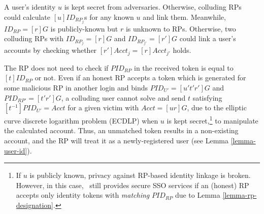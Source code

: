 A user's identity $u$ is kept secret from adversaries. Otherwise, colluding RPs could calculate $[u]ID_{RP_j}$s for any known $u$ and link them.
Meanwhile, $ID_{RP} = [r]G$ is publicly-known but $r$ is unknown to RPs.
Otherwise, two colluding RPs with $ID_{RP_j} = [r]G$ and $ID_{RP_{j'}} = [r']G$ could link a user's accounts by checking whether $[r']Acct_j = [r]Acct_{j'}$ holds.

The RP does not need to check if $PID_{RP}$ in the received token is equal to $[t]{ID_{RP}}$ or not.
Even if an honest RP accepts a token which is generated for some malicious RP in another login and binds $PID_{U'} = [u't'r']G$ and $PID_{RP'}=[t'r']G$,
 a colluding user cannot solve and send $t$ satisfying $[t^{-1}]PID_{U'} = Acct$ for a given victim with $Acct = [ur]G$,
 due to the elliptic curve discrete logarithm problem (ECDLP) when $u$ is kept secret,\footnote{If $u$ is publicly known, privacy against RP-based identity linkage is broken.
    However, in this case, \usso\ still provides secure SSO services if an (honest) RP accepts only identity tokens with \emph{matching} $PID_{RP}$ due to Lemma \ref{lemma-rp-designation}.}
    to manipulate the calculated account.
Thus, an unmatched token results in a non-existing account, and the RP will treat it as a newly-registered user (see Lemma \ref{lemma-user-id}).
 

